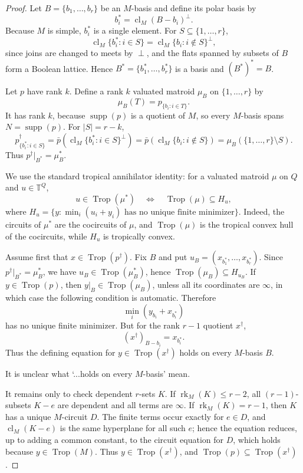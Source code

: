 \documentclass[12pt]{article}
\theoremstyle{definition}
\newcommand{\T}{\mathbb T}
\newcommand{\Trop}{\operatorname{Trop}}
\newcommand{\rk}{\operatorname{rk}}
\newcommand{\cl}{\operatorname{cl}}
\newcommand{\supp}{\operatorname{supp}}
\newcommand{\review}[1]{\begin{reviewbox}#1\end{reviewbox}}
\begin{document}
\begin{proof}
Let \(B=\{b_1,\ldots,b_r\}\) be an \(M\)-basis and define its polar basis by
\[
b_i^*=\cl_M(B-b_i)^\perp.
\]
Because \(M\) is simple, \(b_i^*\) is a single element.  For \(S\subseteq\{1,\ldots,r\}\),
\[
\cl_M\{b_i^*:i\in S\}
=
\cl_M\{b_i:i\notin S\}^{\perp},
\]
since joins are changed to meets by \(\perp\), and the flats spanned by subsets of \(B\) form a Boolean lattice.  Hence \(B^*=\{b_1^*,\ldots,b_r^*\}\) is a basis and \((B^*)^*=B\).

Let \(p\) have rank \(k\).  Define a rank \(k\) valuated matroid \(\mu_B\) on \(\{1,\ldots,r\}\) by
\[
\mu_B(T)=p_{\{b_i:i\in T\}}.
\]
It has rank \(k\), because \(\supp(p)\) is a quotient of \(M\), so every \(M\)-basis spans \(N=\supp(p)\).  For \(|S|=r-k\),
\[
p^\dagger_{\{b_i^*:i\in S\}}
=
\bar p\!\left(\cl_M\{b_i^*:i\in S\}^{\perp}\right)
=
\bar p\!\left(\cl_M\{b_i:i\notin S\}\right)
=
\mu_B(\{1,\ldots,r\}\setminus S).
\]
Thus \(p^\dagger|_{B^*}=\mu_B^*\).

We use the standard tropical annihilator identity: for a valuated matroid \(\mu\) on \(Q\) and \(u\in\T^Q\),
\[
u\in\Trop(\mu^*)\quad\Longleftrightarrow\quad
\Trop(\mu)\subseteq H_u,
\]
where \(H_u=\{y:\min_i(u_i+y_i)\text{ has no unique finite minimizer}\}\).  Indeed, the circuits of \(\mu^*\) are the cocircuits of \(\mu\), and \(\Trop(\mu)\) is the tropical convex hull of the cocircuits, while \(H_u\) is tropically convex.

Assume first that \(x\in\Trop(p^\dagger)\).  Fix \(B\) and put \(u_B=(x_{b_1^*},\ldots,x_{b_r^*})\).  Since \(p^\dagger|_{B^*}=\mu_B^*\), we have \(u_B\in\Trop(\mu_B^*)\), hence \(\Trop(\mu_B)\subseteq H_{u_B}\).  If \(y\in\Trop(p)\), then \(y|_B\in\Trop(\mu_B)\), unless all its coordinates are \(\infty\), in which case the following condition is automatic.  Therefore
\[
\min_i(y_{b_i}+x_{b_i^*})
\]
has no unique finite minimizer.  But for the rank \(r-1\) quotient \(x^\dagger\),
\[
(x^\dagger)_{B-b_i}=x_{b_i^*}.
\]
Thus the defining equation for \(y\in\Trop(x^\dagger)\) holds on every \(M\)-basis \(B\). \review{It is unclear what `...holds on every $M$-basis' mean.}

It remains only to check dependent \(r\)-sets \(K\).  If \(\rk_M(K)\le r-2\), all \((r-1)\)-subsets \(K-e\) are dependent and all terms are \(\infty\).  If \(\rk_M(K)=r-1\), then \(K\) has a unique \(M\)-circuit \(D\).  The finite terms occur exactly for \(e\in D\), and \(\cl_M(K-e)\) is the same hyperplane for all such \(e\); hence the equation reduces, up to adding a common constant, to the circuit equation for \(D\), which holds because \(y\in\Trop(M)\).  Thus \(y\in\Trop(x^\dagger)\), and \(\Trop(p)\subseteq\Trop(x^\dagger)\).


\end{proof}
\end{document}
